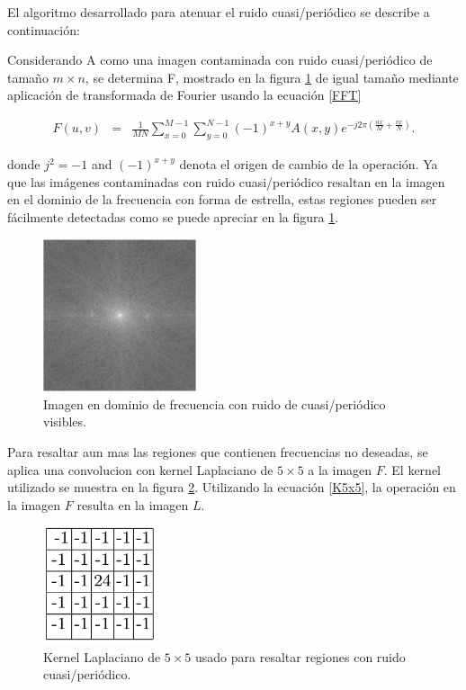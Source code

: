 \documentclass[10pt,letterpaper]{article}
\begin{document}
El algoritmo desarrollado para atenuar el ruido cuasi/periódico se describe a continuación:

Considerando A como una imagen contaminada con ruido cuasi/periódico de tamaño $m \times n$, se determina F, mostrado en la figura \ref{tif17} de igual tamaño mediante aplicación de transformada de Fourier usando la ecuación \ref{FFT}

\begin{eqnarray}
\label{FFT}
F(u,v)&=&\frac{1}{MN}\sum_{x=0}^{M-1}\sum_{y=0}^{N-1}(-1)^{x+y}A(x,y)e^{-j2\pi(\frac{ux}{M}+\frac{vx}{N})}.
\end{eqnarray}

donde $j^2 = -1$ and $(-1)^{x+y}$ denota el origen de cambio de la operación. Ya que las imágenes contaminadas con ruido cuasi/periódico resaltan en la imagen en el dominio de la frecuencia con forma de estrella, estas regiones pueden ser fácilmente detectadas como se puede apreciar en la figura \ref{tif17}.

\begin{figure}[H]
	\centering
    \includegraphics[width=0.4\textwidth]{tifs/tif17.png}
    \caption{Imagen en dominio de frecuencia con ruido de cuasi/periódico visibles.}
    \label{tif17}
\end{figure}

Para resaltar aun mas las regiones que contienen frecuencias no deseadas, se aplica una convolucion con kernel Laplaciano de $5 \times 5$ a la imagen $F$. El kernel utilizado se muestra en la figura \ref{tif24}. Utilizando la ecuación \ref{K5x5}, la operación en la imagen $F$ resulta en la imagen $L$.  

\begin{figure}[H]
	\centering
    \includegraphics[width=0.3\textwidth]{tifs/tif24.png}
    \caption{Kernel Laplaciano de $5 \times 5$ usado para resaltar regiones con ruido cuasi/periódico.}
    \label{tif24}
\end{figure}
\end{document}
